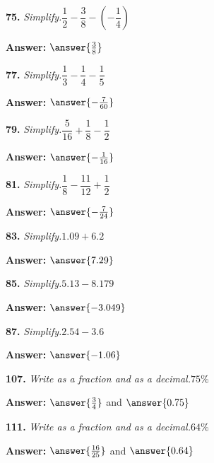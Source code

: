 \documentclass{ximera}
\begin{document}
\begin{problem}
\textbf{75.} \emph{Simplify.}\quad $\dfrac{1}{2} - \dfrac{3}{8} - \left(-\dfrac{1}{4}\right)$

\textbf{Answer:} $\answer{\frac{3}{8}}$
\end{problem}

\begin{problem}
\textbf{77.} \emph{Simplify.}\quad $\dfrac{1}{3} - \dfrac{1}{4} - \dfrac{1}{5}$

\textbf{Answer:} $\answer{-\frac{7}{60}}$
\end{problem}

\begin{problem}
\textbf{79.} \emph{Simplify.}\quad $\dfrac{5}{16} + \dfrac{1}{8} - \dfrac{1}{2}$

\textbf{Answer:} $\answer{-\frac{1}{16}}$
\end{problem}

\begin{problem}
\textbf{81.} \emph{Simplify.}\quad $\dfrac{1}{8} - \dfrac{11}{12} + \dfrac{1}{2}$

\textbf{Answer:} $\answer{-\frac{7}{24}}$
\end{problem}

\begin{problem}
\textbf{83.} \emph{Simplify.}\quad $1.09 + 6.2$

\textbf{Answer:} $\answer{7.29}$
\end{problem}

\begin{problem}
\textbf{85.} \emph{Simplify.}\quad $5.13 - 8.179$

\textbf{Answer:} $\answer{-3.049}$
\end{problem}

\begin{problem}
\textbf{87.} \emph{Simplify.}\quad $2.54 - 3.6$

\textbf{Answer:} $\answer{-1.06}$
\end{problem}

\begin{problem}
\textbf{107.} \emph{Write as a fraction and as a decimal.}\quad $75\%$

\textbf{Answer:} $\answer{\frac{3}{4}}$ and $\answer{0.75}$
\end{problem}

\begin{problem}
\textbf{111.} \emph{Write as a fraction and as a decimal.}\quad $64\%$

\textbf{Answer:} $\answer{\frac{16}{25}}$ and $\answer{0.64}$
\end{problem}
\end{document}

